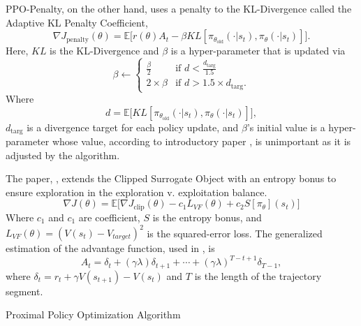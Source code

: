 PPO-Penalty, on the other hand, uses a penalty to the KL-Divergence called the Adaptive KL Penalty Coefficient, $$\nabla J_{\text{penalty}}(\theta)=\mathbb{E}\big[r(\theta)A_t - \beta KL[\pi_{\theta_\text{old}}(\cdot | s_t), \pi_\theta (\cdot | s_t)]\big].$$ Here, $KL$ is the KL-Divergence and $\beta$ is a hyper-parameter that is updated via 
\begin{equation*}
	\beta \leftarrow \begin{cases}
		\frac{\beta}{2} &\mbox{if }d<\frac{d_{\text{targ}}}{1.5} \\
		2\times \beta &\mbox{if }d>1.5\times d_{\text{targ}}.
	\end{cases}
\end{equation*} Where $$d=\mathbb{E}\big[KL[\pi_{\theta_{\text{old}}}(\cdot | s_t), \pi_\theta(\cdot | s_t)]\big],$$ $d_\text{targ}$ is a divergence target for each policy update, and $\beta$'s initial value is a hyper-parameter whose value, according to introductory paper \cite{schulman_wolski_dharwal_radford_klimov_2017}, is unimportant as it is adjusted by the algorithm.

The paper, \cite{schulman_wolski_dharwal_radford_klimov_2017}, extends the Clipped Surrogate Object with an entropy bonus to ensure exploration in the exploration v. exploitation balance. \begin{equation}\label{eq:PPO_objective}
\nabla J(\theta)=\mathbb{E}\big[\nabla J_{\text{clip}}(\theta) - c_1 L_{VF}(\theta)+c_2 S[\pi_\theta](s_t)\big]\end{equation} Where $c_1$ and $c_1$ are coefficient, $S$ is the entropy bonus, and $L_{VF}(\theta)=(V(s_t)-V_{target})^2$ is the squared-error loss. The generalized estimation of the advantage function, used in \cite{schulman_wolski_dharwal_radford_klimov_2017}, is $$A_t=\delta_t+(\gamma\lambda)\delta_{t+1}+\cdots+(\gamma\lambda)^{T-t+1}\delta_{T-1},$$ where $\delta_t=r_t+\gamma V(s_{t+1})-V(s_t)$ and $T$ is the length of the trajectory segment.

\begin{algorithm}\label{algo:PPO}
	\SetAlgoLined
	\DontPrintSemicolon
	\caption{Proximal Policy Optimization Algorithm}
\end{algorithm}